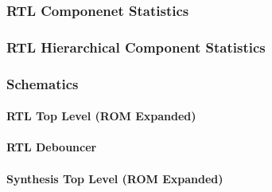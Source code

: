 \documentclass[12pt]{article}
\begin{document}
\subsubsection*{RTL Componenet Statistics}

\subsubsection*{RTL Hierarchical Component Statistics}

\subsubsection*{Schematics}

\paragraph*{RTL Top Level (ROM Expanded)}

\paragraph*{RTL Debouncer}

\paragraph*{Synthesis Top Level (ROM Expanded)}
\end{document}
